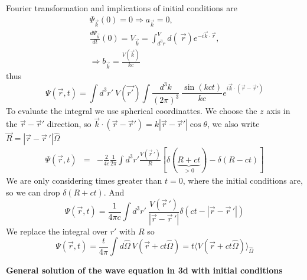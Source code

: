 \documentclass[12pt,a4paper]{article}
\newcommand{\integral}[3]{\int_{#1}^{#2} d #3 \ } %
\begin{document}
Fourier transformation and implications of initial conditions are
\begin{equation}
	\begin{split}
		\Psi_{\vec{k}}(0) = 0 \Rightarrow a_{\vec{k}} = 0, \\
		\frac{d\Psi_{\vec{k}}}{dt}(0) = V_{\vec{k}} = \integral{d^3r} V(\vec{r})e^{-i\vec{k}\cdot\vec{r}}, \\ \Rightarrow  b_{\vec{k}} = \frac{V(\vec{k})}{kc}
	\end{split}
\end{equation}
thus
\begin{equation}
\Psi(\vec{r},t) = \int d^3 r' \ V(\vec{r'}) \int \frac{d^3k}{(2\pi)^3}\ \frac{\sin (kct)}{kc} e^{i\vec{k}\cdot(\vec{r}-\vec{r}')}
\end{equation}
To evaluate the integral we use spherical coordinattes. We choose the $z$ axis in the $\vec{r}-\vec{r}'$ direction, so $\vec{k}\cdot(\vec{r}-\vec{r}') = k|\vec{r}-\vec{r}'|\cos \theta$, we also write $\vec{R} = |\vec{r}-\vec{r}\,'|\hat{\Omega}$
\begin{eqnarray}
	\Psi(\vec{r},t)& = & -\frac{2}{4c} \frac{1}{2\pi} \int d^3r' \frac{V(\vec{r}\,')}{R} \left[\delta(\underbrace{R+ct}_{>0}) - \delta(R-ct) \right]
\end{eqnarray}
We are only considering times greater than $t = 0$, where the initial conditions are, so we can drop $\delta(R+ct)$. And
\begin{equation}
	\Psi(\vec{r},t) = \frac{1}{4\pi c} \int d^3r' \  \frac{V(\vec{r}\,')}{|\vec{r}-\vec{r}\,'|} \delta(ct-|\vec{r}-\vec{r}\,'|)
\end{equation}
We replace the integral over $r'$ with $R$ so
\begin{equation}
	\Psi(\vec{r},t) = \frac{t}{4\pi} \int d\hat{\Omega} \ V(\vec{r} + ct\hat{\Omega}) = t \langle V(\vec{r} + ct\hat{\Omega}) \rangle_{\hat{\Omega}}
\end{equation}

\textbf{General solution of the wave equation in 3d with initial conditions}
\end{document}
